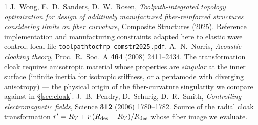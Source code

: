 \documentclass[11pt]{article}
\begin{document}
\begin{thebibliography}{1}
J.~Wong, E.~D.~Sanders, D.~W.~Rosen,
\emph{Toolpath-integrated topology optimization for design of additively
manufactured fiber-reinforced structures considering limits on fiber curvature},
Composite Structures (2025). Reference implementation and manufacturing
constraints adapted here to elastic wave control; local file
\texttt{toolpathtocfrp-comstr2025.pdf}.
A.~N.~Norris, \emph{Acoustic cloaking theory}, Proc.\ R.\ Soc.\ A \textbf{464}
(2008) 2411--2434. The transformation cloak requires anisotropic material whose
properties are \emph{singular} at the inner surface (infinite inertia for isotropic
stiffness, or a pentamode with diverging anisotropy) --- the physical origin of the
fiber-curvature singularity we compare against in \S\ref{sec:cloak}.
J.~B.~Pendry, D.~Schurig, D.~R.~Smith, \emph{Controlling electromagnetic fields},
Science \textbf{312} (2006) 1780--1782. Source of the radial cloak transformation
$r'=R_V+r\,(R_{\rm des}-R_V)/R_{\rm des}$ whose fiber image we evaluate.
\end{thebibliography}
\end{document}
